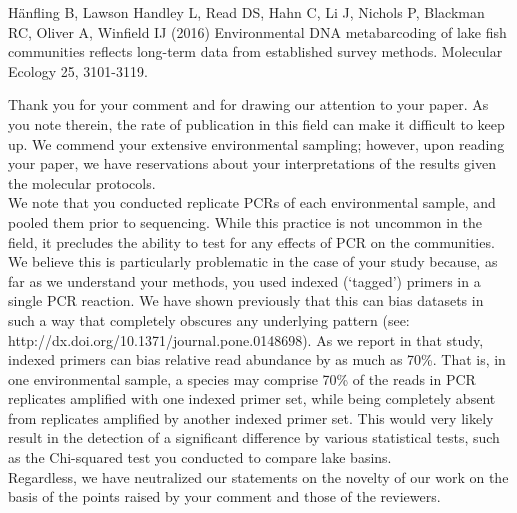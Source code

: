 \documentclass{article}
\newenvironment{response}
	{
	\begin{adjustwidth}{1cm}{0cm}
	\color{peerjBlue}
	}
	{
	\end{adjustwidth}
	}
\begin{document}
Hänfling B, Lawson Handley L, Read DS, Hahn C, Li J, Nichols P, Blackman RC, Oliver A, Winfield IJ (2016) Environmental DNA metabarcoding of lake fish communities reflects long-term data from established survey methods. Molecular Ecology 25, 3101-3119.
\begin{response}
  Thank you for your comment and for drawing our attention to your paper.
	As you note therein, the rate of publication in this field can make it difficult to keep up.
	We commend your extensive environmental sampling; however, upon reading your paper, we have reservations about your interpretations of the results given the molecular protocols.
  \\


	We note that you conducted replicate PCRs of each environmental sample, and pooled them prior to sequencing.
	While this practice is not uncommon in the field, it precludes the ability to test for any effects of PCR on the communities.
	We believe this is particularly problematic in the case of your study because, as far as we understand your methods, you used indexed (`tagged') primers in a single PCR reaction.
	We have shown previously that this can bias datasets in such a way that completely obscures any underlying pattern (see: http://dx.doi.org/10.1371/journal.pone.0148698).
	As we report in that study, indexed primers can bias relative read abundance by as much as 70\%.
	That is, in one environmental sample, a species may comprise 70\% of the reads in PCR replicates amplified with one indexed primer set, while being completely absent from replicates amplified by another indexed primer set.
	This would very likely result in the detection of a significant difference by various statistical tests, such as the Chi-squared test you conducted to compare lake basins.
  \\


	Regardless, we have neutralized our statements on the novelty of our work on the basis of the points raised by your comment and those of the reviewers.



\end{response}
\end{document}
